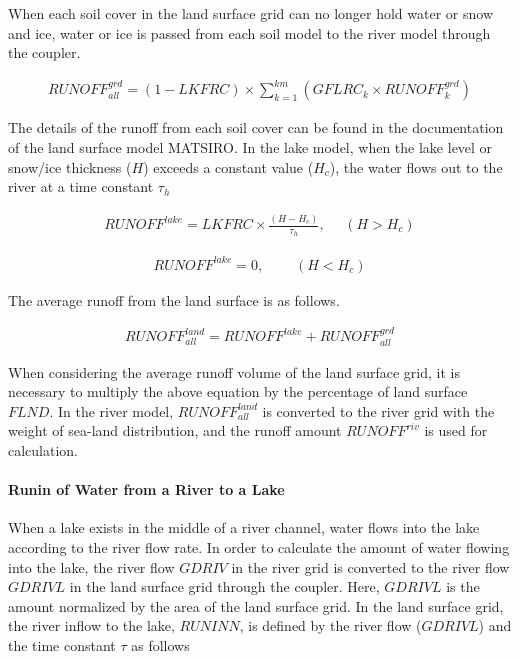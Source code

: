 When each soil cover in the land surface grid can no longer hold water
or snow and ice, water or ice is passed from each soil model to the
river model through the coupler.

\begin{eqnarray} RUNOFF^{grd}_{all} =
    (1-LKFRC) \times \sum_{k=1}^{km}(GFLRC_{k} \times RUNOFF^{grd}_{k}) \end{eqnarray}

The details of the runoff from each soil cover can be found in the
documentation of the land surface model MATSIRO. In the lake model, when
the lake level or snow/ice thickness (\(H\)) exceeds a constant value
(\(H_c\)), the water flows out to the river at a time constant
\(\tau_h\)

\begin{eqnarray} RUNOFF^{lake} = LKFRC \times \frac{(H-H_c)}{\tau_h},~~~~~~ (H>H_c) \end{eqnarray}

\begin{eqnarray} RUNOFF^{lake} = 0,~~~~~~~~~~ (H<H_c) \end{eqnarray}

The average runoff from the land surface is as follows.

\begin{eqnarray} RUNOFF^{land}_{all} = RUNOFF^{lake} + RUNOFF^{grd}_{all} \end{eqnarray}

When considering the average runoff volume of the land surface grid, it
is necessary to multiply the above equation by the percentage of land
surface \(FLND\). In the river model, \(RUNOFF^{land}_{all}\) is
converted to the river grid with the weight of sea-land distribution,
and the runoff amount \(RUNOFF^{riv}\) is used for calculation.

\hypertarget{runin-of-water-from-a-river-to-a-lake}{%
\paragraph{Runin of Water from a River to a
Lake}\label{runin-of-water-from-a-river-to-a-lake}}

When a lake exists in the middle of a river channel, water flows into
the lake according to the river flow rate. In order to calculate the
amount of water flowing into the lake, the river flow \(GDRIV\) in the
river grid is converted to the river flow \(GDRIVL\) in the land surface
grid through the coupler. Here, \(GDRIVL\) is the amount normalized by
the area of the land surface grid. In the land surface grid, the river
inflow to the lake, \(RUNINN\), is defined by the river flow
(\(GDRIVL\)) and the time constant \(\tau\) as follows

